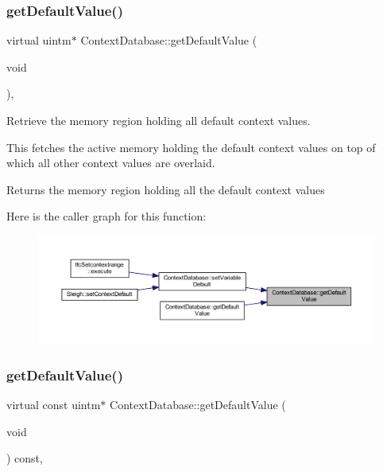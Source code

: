 \mbox{\label{class_context_database_aaefe473eb8e2175df51c17d250d13c51}} 
\subsubsection{\texorpdfstring{getDefaultValue()}{getDefaultValue()}\hspace{0.1cm}{\footnotesize\ttfamily [1/3]}}
{\footnotesize\ttfamily virtual uintm$\ast$ Context\+Database\+::get\+Default\+Value (\begin{DoxyParamCaption}\item[{void}]{ }\end{DoxyParamCaption})\hspace{0.3cm}{\ttfamily [protected]}, {}}



Retrieve the memory region holding all default context values. 

This fetches the active memory holding the default context values on top of which all other context values are overlaid. \begin{DoxyReturn}{Returns}
the memory region holding all the default context values 
\end{DoxyReturn}
Here is the caller graph for this function\+:
\nopagebreak
\begin{figure}[H]
\begin{center}
\leavevmode
\includegraphics[width=350pt]{class_context_database_aaefe473eb8e2175df51c17d250d13c51_icgraph}
\end{center}
\end{figure}
\mbox{\label{class_context_database_a615c33c424edd6ed84d73cdfb6d2e331}} 
\subsubsection{\texorpdfstring{getDefaultValue()}{getDefaultValue()}\hspace{0.1cm}{\footnotesize\ttfamily [2/3]}}
{\footnotesize\ttfamily virtual const uintm$\ast$ Context\+Database\+::get\+Default\+Value (\begin{DoxyParamCaption}\item[{void}]{ }\end{DoxyParamCaption}) const\hspace{0.3cm}{\ttfamily [protected]}, {}}



